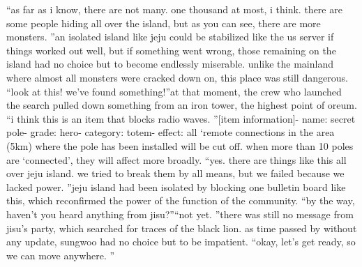 “as far as i know, there are not many.
 one thousand at most, i think.
 there are some people hiding all over the island, but as you can see, there are more monsters.
”an isolated island like jeju could be stabilized like the us server if things worked out well, but if something went wrong, those remaining on the island had no choice but to become endlessly miserable.
 unlike the mainland where almost all monsters were cracked down on, this place was still dangerous.
“look at this! we’ve found something!”at that moment, the crew who launched the search pulled down something from an iron tower, the highest point of oreum.
“i think this is an item that blocks radio waves.
”[item information]- name: secret pole- grade: hero- category: totem- effect: all ‘remote connections in the area (5km) where the pole has been installed will be cut off.
 when more than 10 poles are ‘connected’, they will affect more broadly.
“yes.
 there are things like this all over jeju island.
 we tried to break them by all means, but we failed because we lacked power.
”jeju island had been isolated by blocking one bulletin board like this, which reconfirmed the power of the function of the community.
“by the way, haven’t you heard anything from jisu?”“not yet.
”there was still no message from jisu’s party, which searched for traces of the black lion.
 as time passed by without any update, sungwoo had no choice but to be impatient.
“okay, let’s get ready, so we can move anywhere.
”

 